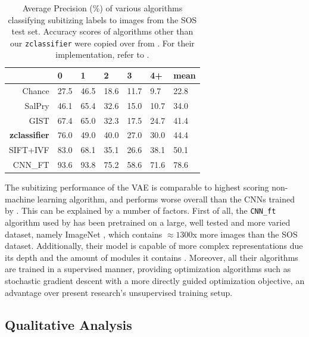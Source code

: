 \documentclass[twocolumn]{article}
\begin{document}
\begin{longtable}[]{@{}rllllll@{}}
\caption{Average Precision (\%) of various algorithms classifying subitizing labels to images from the SOS test set. Accuracy scores of algorithms other than our \texttt{zclassifier} were copied over from \citet{zhang2016salient}. For their
implementation, refer to \citet{zhang2016salient}. }\label{tab:sub-performance}\\
\toprule
& 0 & 1 & 2 & 3 & 4+ & mean\tabularnewline
\midrule
\endhead
Chance & 27.5 & 46.5 & 18.6 & 11.7 & 9.7 & 22.8\tabularnewline
SalPry & 46.1 & 65.4 & 32.6 & 15.0 & 10.7 & 34.0\tabularnewline
GIST & 67.4 & 65.0 & 32.3 & 17.5 & 24.7 & 41.4\tabularnewline
\textbf{zclassifier} & 76.0 & 49.0 & 40.0 & 27.0 & 30.0 & 44.4\tabularnewline
SIFT+IVF & 83.0 & 68.1 & 35.1 & 26.6 & 38.1 & 50.1\tabularnewline
CNN\_FT & 93.6 & 93.8 & 75.2 & 58.6 & 71.6 & 78.6\tabularnewline
\bottomrule
\end{longtable}
The subitizing performance of the VAE is comparable to highest scoring
non-machine learning algorithm, and performs worse overall than the CNNs
trained by \citet{zhang2016salient}. This can be explained by a number
of factors. First of all, the \texttt{CNN\_ft} algorithm used by
\citet{zhang2016salient} has been pretrained on a large, well tested and
more varied dataset, namely ImageNet \citep{russakovsky2015imagenet},
which contains \(\approx 1300\)x more images than the SOS dataset. Additionally, their model
is capable of more complex representations due its depth and the amount
of modules it contains \citep[the applied model from][ uses 22 modules compared
to the 12 in our approach]{szegedy2015going}. Moreover, all their
algorithms are trained in a supervised manner, providing optimization
algorithms such as stochastic gradient descent with a more directly
guided optimization objective, an advantage over present research's
unsupervised training setup.

\hypertarget{qualitative-analysis}{%
\subsection{Qualitative Analysis}\label{qualitative-analysis}}
\end{document}
